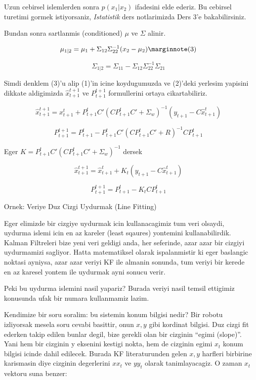 \documentclass[12pt,fleqn]{article}\usepackage{../common}
\begin{document}
Uzun cebirsel islemlerden sonra $p(x_1|x_2)$ ifadesini elde ederiz. Bu
cebirsel turetimi gormek istiyorsaniz, {\em Istatistik} ders notlarimizda
Ders 3'e bakabilirsiniz.

Bundan sonra sartlanmis (conditioned) $\mu$ ve $\Sigma$ alinir.

\[ 
\mu_{1|2} = \mu_1 + \Sigma_{12}\Sigma_{22}^{-1}(x_2 - \mu_2) 
\mlabel{3}
\]

\[ \Sigma_{1|2} = \Sigma_{11}- \Sigma_{12}\Sigma_{22}^{-1}\Sigma_{21} \]

Simdi denklem (3)'u alip (1)'in icine koydugumuzda ve (2)'deki
yerlesim yapisini dikkate aldigimizda $\hat{x}_{t+1}^{t+1}$ ve
$P_{t+1}^{t+1}$ formullerini ortaya cikartabiliriz.

\[ \hat{x}_{t+1}^{t+1} =  x_{t+1}^{t} +  P_{t+1}^{t}C'(CP_{t+1}^{t}C' + \Sigma_w)^{-1}
(y_{t+1}- C\hat{x}_{t+1}^t)
\]

\[ P_{t+1}^{t+1} = P_{t+1}^{t} - P_{t+1}^{t} C'(CP_{t+1}^{t} C'+R)^{-1}CP_{t+1}^{t} 
\]

Eger $K = P_{t+1}^{t}C'(CP_{t+1}^{t}C' + \Sigma_w)^{-1}$ dersek

\[  \hat{x}_{t+1}^{t+1}  =  \hat{x}_{t+1}^{t} + K_t (y_{t+1} - C \hat{x}_{t+1}^{t})  \]

\[  P_{t+1}^{t+1} =  P_{t+1}^{t} - K_tC P_{t+1}^{t} \]

Ornek: Veriye Duz Cizgi Uydurmak (Line Fitting)

Eger elimizde bir cizgiye uydurmak icin kullanacagimiz tum veri olsaydi,
uydurma islemi icin en az kareler (least sqaures) yontemini
kullanabilirdik.  Kalman Filtreleri bize yeni veri geldigi anda, her
seferinde, azar azar bir cizgiyi uydurmamizi sagliyor. Hatta matematiksel
olarak ispalanmistir ki eger baslangic noktasi ayniysa, azar azar veriyi KF
ile almanin sonunda, tum veriyi bir kerede en az karesel yontem ile
uydurmak ayni sonucu verir.

Peki bu uydurma islemini nasil yapariz? Burada veriyi nasil temsil ettigimiz
konusunda ufak bir numara kullanmamiz lazim.

Kendimize bir soru soralim: bu sistemin konum bilgisi nedir? Bir robotu
izliyorsak mesela soru cevabi basittir, onun $x, y$ gibi kordinat
bilgisi. Duz cizgi fit ederken takip edilen bunlar degil, bize gerekli olan
bir cizginin ``egimi (slope)''. Yani hem bir cizginin y eksenini kestigi
nokta, hem de cizginin egimi $x_t$ konum bilgisi icinde dahil edilecek. Burada
KF literaturunden gelen $x, y$ harfleri birbirine karismasin diye cizginin
degerlerini $xx_t$ ve $yy_t$ olarak tanimlayacagiz. O zaman $x_t$ vektoru suna
benzer:
\end{document}

